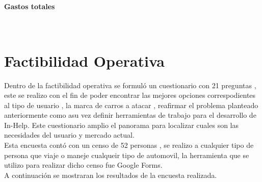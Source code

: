 \paragraph{Gastos totales} \textcolor{White}{.} \newline
%
%  
\section{Factibilidad Operativa}
Dentro de la factibilidad operativa se formuló un cuestionario con 21 preguntas , este se realizo con el fin de poder encontrar las mejores opciones correspodientes al tipo de usuario , la marca de carros a atacar , reafirmar el problema planteado anteriormente como asu vez definir herramientas de trabajo para el desarrollo de In-Help. Este cuestionario amplio el panorama para localizar cuales son las necesidades del usuario y mercado actual. \\
Esta encuesta contó con un censo de 52 personas , se realizo a cualquier tipo de persona que viaje o maneje cualqueir tipo de automovil, la herramienta que se utilizo para realizar dicho censo fue Google Forms. \\
A continuación se mostraran los resultados de la encuesta realizada.
